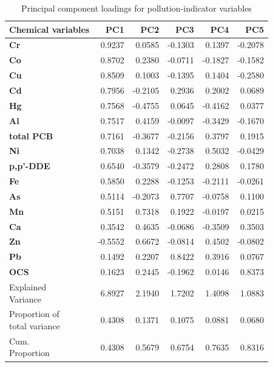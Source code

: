 
\begin{table}[htbp]
  \centering
  \caption{Principal component loadings for pollution-indicator variables}
  \label{tab:01_pollution_assessment_pc_loadings}
  \begin{tabular}{lrrrrr}
    \toprule
    \textbf{Chemical variables} & \textbf{PC1} & \textbf{PC2} & \textbf{PC3} & \textbf{PC4} & \textbf{PC5} \\
    \midrule
    \textbf{Cr} & 0.9237 & 0.0585 & -0.1303 & 0.1397 & -0.2078 \\
    \textbf{Co} & 0.8702 & 0.2380 & -0.0711 & -0.1827 & -0.1582 \\
    \textbf{Cu} & 0.8509 & 0.1003 & -0.1395 & 0.1404 & -0.2580 \\
    \textbf{Cd} & 0.7956 & -0.2105 & 0.2936 & 0.2002 & 0.0689 \\
    \textbf{Hg} & 0.7568 & -0.4755 & 0.0645 & -0.4162 & 0.0377 \\
    \textbf{Al} & 0.7517 & 0.4159 & -0.0097 & -0.3429 & -0.1670 \\
    \textbf{total PCB} & 0.7161 & -0.3677 & -0.2156 & 0.3797 & 0.1915 \\
    \addlinespace
    \textbf{Ni} & 0.7038 & 0.1342 & -0.2738 & 0.5032 & -0.0429 \\
    \textbf{p,p'-DDE} & 0.6540 & -0.3579 & -0.2472 & 0.2808 & 0.1780 \\
    \textbf{Fe} & 0.5850 & 0.2288 & -0.1253 & -0.2111 & -0.0261 \\
    \textbf{As} & 0.5114 & -0.2073 & 0.7707 & -0.0758 & 0.1100 \\
    \textbf{Mn} & 0.5151 & 0.7318 & 0.1922 & -0.0197 & 0.0215 \\
    \addlinespace
    \textbf{Ca} & 0.3542 & 0.4635 & -0.0686 & -0.3509 & 0.3503 \\
    \textbf{Zn} & -0.5552 & 0.6672 & -0.0814 & 0.4502 & -0.0802 \\
    \textbf{Pb} & 0.1492 & 0.2207 & 0.8422 & 0.3916 & 0.0767 \\
    \textbf{OCS} & 0.1623 & 0.2445 & -0.1962 & 0.0146 & 0.8373 \\
    \midrule
    \makecell{Explained\\Variance} & 6.8927 & 2.1940 & 1.7202 & 1.4098 & 1.0883 \\
    \makecell{Proportion of\\total variance} & 0.4308 & 0.1371 & 0.1075 & 0.0881 & 0.0680 \\
    \makecell{Cum.\\Proportion} & 0.4308 & 0.5679 & 0.6754 & 0.7635 & 0.8316 \\
    \bottomrule
  \end{tabular}
\end{table}

